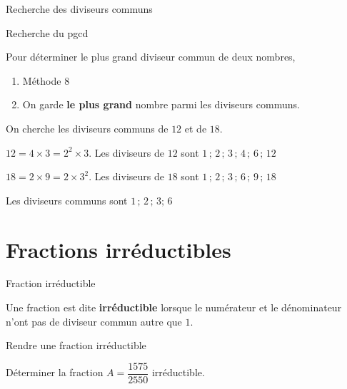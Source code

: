 \begin{pageCours}
\begin{minipage}[t]{0.5\linewidth}
\begin{MtT}{Recherche des diviseurs communs}
\end{MtT}
\end{minipage}
\begin{minipage}[t]{0.5\linewidth}
\begin{MtT}{Recherche du pgcd}

Pour déterminer le plus grand diviseur commun de deux nombres, 
\begin{enumerate}[leftmargin=*]
\item Méthode $8$  
\item On garde \textbf{le plus grand} nombre parmi les diviseurs communs.
\end{enumerate}


\end{MtT}
\end{minipage}
  
 

\begin{Ex} 
\begin{minipage}{0.6\linewidth}
On cherche les diviseurs communs de $12$ et de $18$.

$12 = 4 \times 3 = 2^2 \times 3$. Les diviseurs de $12$ sont $1\,;\,2\,;\,3\,;\,4\,;\,6\,;\,12$

$18 = 2 \times 9 = 2 \times 3^2$. Les diviseurs de $18$ sont $1\,;\,2\,;\,3\,;\,6\,;\,9\,;\,18$

\end{minipage}
\begin{minipage}{0.4\linewidth}

Les diviseurs communs sont $1\,;\,2\,;\,3;\,6$
\end{minipage}
\end{Ex} 
 
 
 
\section{Fractions irréductibles}


\begin{DefT}{Fraction irréductible}

Une fraction est dite \textbf{irréductible} lorsque le numérateur et le  dénominateur n'ont pas de diviseur commun autre que $1$. 

\end{DefT}
 

\begin{MtT}{Rendre une fraction irréductible}

Déterminer la fraction $A=\dfrac{1575}{2550}$ irréductible.


\end{MtT}
\end{pageCours}
